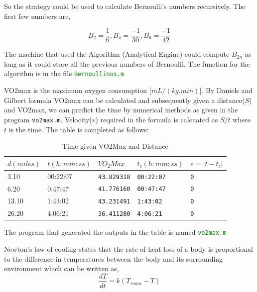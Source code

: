 \documentclass[fleqn,letterpaper,12pt]{report}
\begin{document}
So the strategy could be used to calculate Bernoulli's numbers recursively. The first few numbers are,

$$ B_2 = \frac{1}{6}, B_4 = \frac{-1}{30}, B_6 = \frac{-1}{42}$$

The machine that used the Algorithm (Analytical Engine) could compute $B_{2n}$ as long as it could store all the previous numbers of Bernoulli.\cite{lll} The function for the algorithm is in the file \textcolor{Green}{\tt Bernoullinos.m}\cite{PK}
%
\newpage
{}
{}
\problem
VO2max is the maximum oxygen consumption [$mL/(kg.min)$]. By Daniels and Gilbert formula VO2max can be calculated and subsequently given a distance($S$) and VO2max, we can predict the time by numerical methods as given in the program {\tt vo2max.m}. Velocity{($v$)} required in the formula is calcuated as {$S/t$} where {$ t $} is the time. The table is completed as follows:
\begin{table}[h]
\centering
\caption{Time given VO2Max and Distance}
\label{my-label}
\begin{tabular}{|l|l|l|l|l|}
\hline
$d(miles)$ & $t(h:mm:ss)$ & $VO_2Max$  & $t_c(h:mm:ss)$ & $e = |t - t_c|$ \\ \hline \hline
3.10       & 00:22:07    & {\tt43.829318} & {\tt00:22:07}      & {\tt0}               \\ \hline
6.20       & 0:47:47     & {\tt41.776160} & {\tt00:47:47}      & {\tt0}               \\ \hline
13.10      & 1:43:02     & {\tt43.231491} & {\tt1:43:02}       & {\tt0}               \\ \hline
26.20      & 4:06:21     & {\tt36.411280} & {\tt4:06:21}       & {\tt0}               \\ \hline
\end{tabular}%
\end{table}

The program that generated the outputs in the table is named \textcolor{Green}{\tt vo2max.m}
%
\newpage
{}
{}
\problem
Newton's law of cooling states that the rate of heat loss of a body is proportional to the difference in temperatures between the body and its surrounding environment which can be written as,
\begin{equation}
\frac{dT}{dt} = k(T_{room} -T)
\end{equation}
\end{document}
